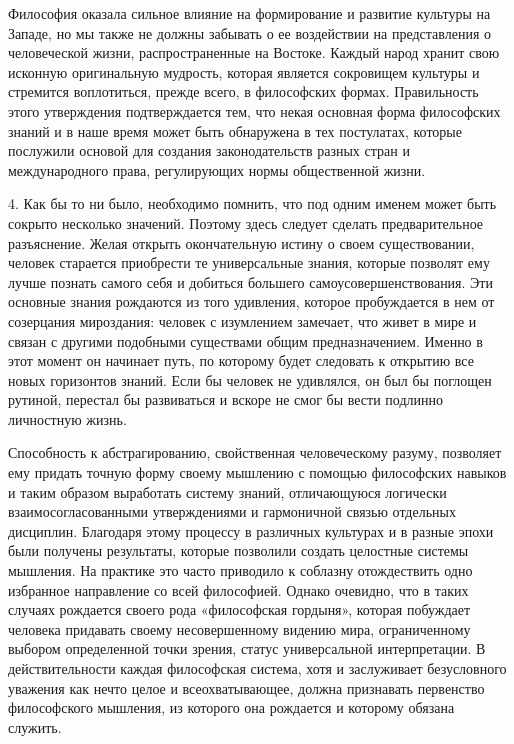 \documentclass[a5paper,10pt]{article}
\begin{document}
Философия оказала сильное влияние на формирование и развитие культуры на
Западе, но мы также не должны забывать о ее воздействии на представления о
человеческой жизни, распространенные на Востоке. Каждый народ хранит свою
исконную оригинальную мудрость, которая является сокровищем культуры и
стремится воплотиться, прежде всего, в философских формах. Правильность этого
утверждения подтверждается тем, что некая основная форма философских знаний и в
наше время может быть обнаружена в тех постулатах, которые послужили основой
для создания законодательств разных стран и международного права, регулирующих
нормы общественной жизни.

4. Как бы то ни было, необходимо помнить, что под одним именем может быть
сокрыто несколько значений. Поэтому здесь следует сделать предварительное
разъяснение. Желая открыть окончательную истину о своем существовании, человек
старается приобрести те универсальные знания, которые позволят ему лучше
познать самого себя и добиться большего самоусовершенствования. Эти основные
знания рождаются из того удивления, которое пробуждается в нем от созерцания
мироздания: человек с изумлением замечает, что живет в мире и связан с другими
подобными существами общим предназначением. Именно в этот момент он начинает
путь, по которому будет следовать к открытию все новых горизонтов знаний. Если
бы человек не удивлялся, он был бы поглощен рутиной, перестал бы развиваться и
вскоре не смог бы вести подлинно личностную жизнь.

Способность к абстрагированию, свойственная человеческому разуму, позволяет ему
придать точную форму своему мышлению с помощью философских навыков и таким
образом выработать систему знаний, отличающуюся логически взаимосогласованными
утверждениями и гармоничной связью отдельных дисциплин. Благодаря этому
процессу в различных культурах и в разные эпохи были получены результаты,
которые позволили создать целостные системы мышления. На практике это часто
приводило к соблазну отождествить одно избранное направление со всей
философией. Однако очевидно, что в таких случаях рождается своего рода
«философская гордыня», которая побуждает человека придавать своему
несовершенному видению мира, ограниченному выбором определенной точки зрения,
статус универсальной интерпретации. В действительности каждая философская
система, хотя и заслуживает безусловного уважения как нечто целое и
всеохватывающее, должна признавать первенство философского мышления, из
которого она рождается и которому обязана служить.
\end{document}
